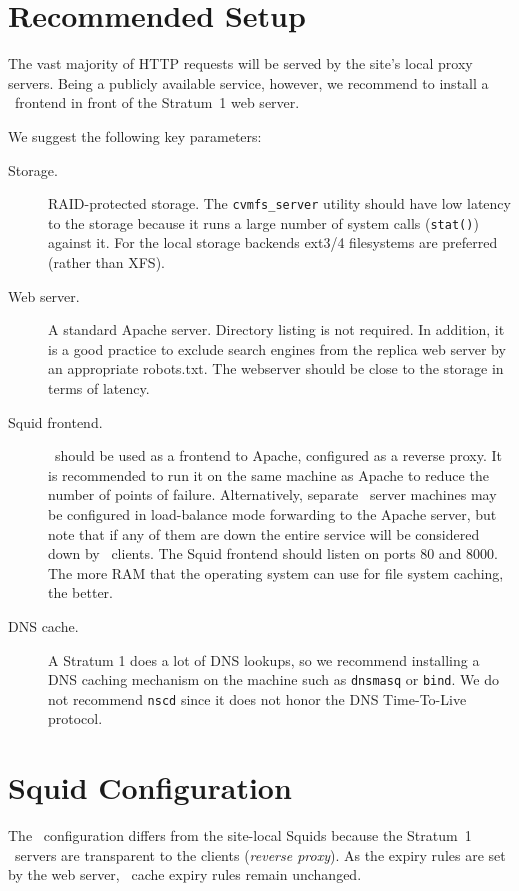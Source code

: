 \section{Recommended Setup}
The vast majority of HTTP requests will be served by the site's local
proxy servers.
Being a publicly available service, however, we recommend to install
a \squid\ frontend in front of the Stratum~1 web server.

We suggest the following key parameters:
\begin{description}
	\item[Storage.] 
		RAID-protected storage.
		The \texttt{cvmfs\_server} utility should have low latency to the storage because it runs a large number of system calls (\texttt{stat()}) against it.
		For the local storage backends ext3/4 filesystems are preferred (rather than XFS).
	\item[Web server.]
		A standard Apache server.
		Directory listing is not required.
		In addition, it is a good practice to exclude search engines from the replica web server by an appropriate robots.txt.
		The webserver should be close to the storage in terms of latency.
	\item[Squid frontend.]
		\squid\ should be used as a frontend to Apache, configured
		as a reverse proxy.  It is recommended to run it on the
		same machine as Apache to reduce the number of points of
		failure.  Alternatively, separate \squid\ server machines
		may be configured in load-balance mode forwarding to the
		Apache server, but note that if any of them are down
		the entire service will be considered down by \cvmfs\
		clients.
		The Squid frontend should listen on ports 80 and 8000.
		The more RAM that the operating system can use for file
		system caching, the better.

	\item[DNS cache.]
		A Stratum 1 does a lot of DNS lookups, so we recommend
		installing a DNS caching mechanism on the machine such
		as \texttt{dnsmasq} or \texttt{bind}.  We do not recommend
		\texttt{nscd} since it does not honor the DNS Time-To-Live
		protocol.
\end{description}

\section{Squid Configuration}
The \squid\ configuration differs from the site-local Squids
because the Stratum~1 \squid\ servers are transparent to the clients
(\emph{reverse proxy}).
As the expiry rules are set by the web server, \squid\ cache expiry
rules remain unchanged.

